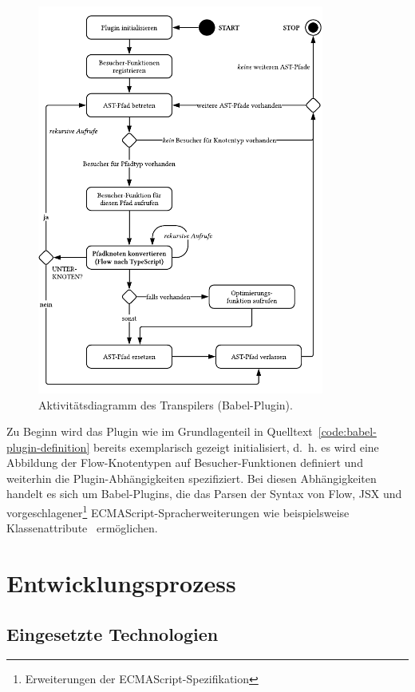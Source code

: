 \begin{figure}[p]
  \centering
  \includegraphics[width=0.84\textwidth]{src/4_Umsetzung/img/activity-diagram-transpiler.pdf}
  \captionsetup{justification=centering}
  \caption{Aktivitätsdiagramm des Transpilers (Babel-Plugin).}
  \label{fig:activity-diagram-transpiler}
\end{figure}

Zu Beginn wird das Plugin wie im Grundlagenteil in Quelltext~\ref{code:babel-plugin-definition} bereits exemplarisch gezeigt initialisiert, d.~h. es wird eine Abbildung der Flow-Knotentypen auf Besucher-Funktionen definiert und weiterhin die Plugin-Abhängigkeiten spezifiziert. Bei diesen Abhängigkeiten handelt es sich um Babel-Plugins, die das Parsen der Syntax von Flow, JSX und vorgeschlagener\footnote{Erweiterungen der ECMAScript-Spezifikation } ECMAScript-Spracherweiterungen wie beispielsweise Klassenattribute~\autocite{} ermöglichen.

\section{Entwicklungsprozess}

\subsection{Eingesetzte Technologien}

